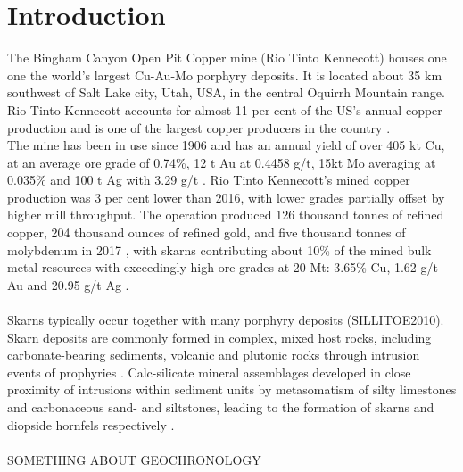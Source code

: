 \documentclass[a4paper,11pt,titlepage]{article}
\begin{document}
\section{Introduction}

The Bingham Canyon Open Pit Copper mine (Rio Tinto Kennecott) houses one one the world's largest Cu-Au-Mo porphyry deposits. It is located about 35 km southwest of Salt Lake city, Utah, USA, in the central Oquirrh Mountain range. Rio Tinto Kennecott accounts for almost 11 per cent of the US’s annual copper production and is one of the largest copper producers in the country \citep{Tinto2017}.
\\The mine has been in use since 1906 and has an annual yield of over 405 kt Cu, at an average ore grade of 0.74\%, 12 t Au at 0.4458 g/t, 15kt Mo averaging at 0.035\% and 100 t Ag with 3.29 g/t \citep{Porter2012,Tinto2017}. Rio Tinto Kennecott’s mined copper production was 3 per cent lower than 2016, with lower grades partially offset by higher mill throughput. The operation produced 126 thousand tonnes of refined copper, 204 thousand ounces of refined gold, and five thousand tonnes of molybdenum in 2017 \citep{Tinto2017}, with skarns contributing about 10\% of the mined bulk metal resources with exceedingly high ore grades at 20 Mt: 3.65\% Cu, 1.62 g/t Au and 20.95 g/t Ag \citep{Krahulec2010,Jowitt2013}. 
\\
\\ Skarns typically occur together with many porphyry deposits (SILLITOE2010). Skarn deposits are commonly formed in complex, mixed host rocks, including carbonate-bearing sediments, volcanic and plutonic rocks through intrusion events of prophyries \citep{Einaudi1982}. Calc-silicate mineral assemblages developed in close proximity of intrusions within sediment units by metasomatism of silty limestones and carbonaceous sand- and siltstones, leading to the formation of skarns  and diopside hornfels respectively \citep{Atkinson1978a}.
\\
\\ SOMETHING ABOUT GEOCHRONOLOGY



\vspace*{10pt}
\end{document}
